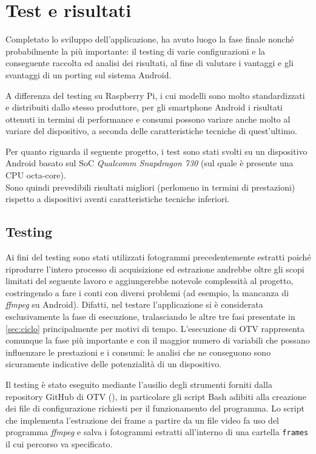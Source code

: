 \chapter{Test e risultati}

Completato lo sviluppo dell'applicazione, ha avuto luogo la fase finale nonché probabilmente la più importante: il testing 
di varie configurazioni e la conseguente raccolta ed analisi dei risultati, al fine di valutare i vantaggi e gli svantaggi di 
un porting sul sistema Android.

A differenza del testing su Raspberry Pi, i cui modelli sono molto standardizzati e distribuiti dallo stesso produttore,
per gli smartphone Android i risultati ottenuti in termini di performance e consumi possono variare anche molto al variare
del dispositivo, a seconda delle caratteristiche tecniche di quest'ultimo.

Per quanto riguarda il seguente progetto, i test sono stati svolti su un dispositivo Android basato sul 
SoC \textit{Qualcomm Snapdragon 730} (sul quale è presente una CPU octa-core).\\
Sono quindi prevedibili risultati 
migliori (perlomeno in termini di prestazioni) rispetto a dispositivi aventi caratteristiche tecniche inferiori.

\section{Testing}

Ai fini del testing sono stati utilizzati fotogrammi precedentemente estratti poiché riprodurre l'intero processo
di acquisizione ed estrazione andrebbe oltre gli scopi limitati del seguente lavoro e aggiungerebbe notevole complessità 
al progetto, costringendo a fare i conti con diversi problemi (ad esempio, la mancanza di \textit{ffmpeg} su Android).
Difatti, nel testare l'applicazione si è considerata esclusivamente la fase di esecuzione, tralasciando le altre tre fasi
presentate in \autoref{sec:ciclo} principalmente per motivi di tempo. L'esecuzione di OTV rappresenta comunque la fase più
importante e con il maggior numero di variabili che possano influenzare le prestazioni e i consumi: le analisi che ne
conseguono sono sicuramente indicative delle potenzialità di un dispositivo.

Il testing è stato eseguito mediante l'ausilio degli strumenti forniti dalla repository GitHub di OTV (\cite{otvgit}),
in particolare gli script Bash adibiti alla creazione dei file di configurazione richiesti per il funzionamento del programma.
Lo script che implementa l'estrazione dei frame a partire da un file video fa uso del programma
\textit{ffmpeg} e salva i fotogrammi estratti all'interno di una cartella \texttt{frames} il cui percorso va specificato.

